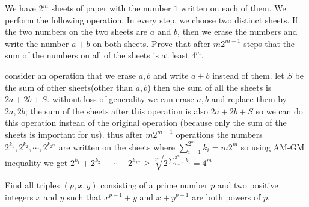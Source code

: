 \documentclass{subfile}
\begin{document}
	
	\begin{problem}
		We have $2^m$ sheets of paper with the number $1$ written on each of them. We perform the following operation. In every step, we choose two distinct sheets. If the two numbers on the two sheets are $a$ and $b$, then we erase the numbers and write the number $a+b$ on both sheets. Prove that after $m2^{m-1}$ steps that the sum of the numbers on all of the sheets is at least $4^m$.
	\end{problem}
	\begin{solution}
		 consider an operation that we erase $a,b$ and write $a+b$ instead of them. let $S$ be the sum of other sheets(other than $a,b$) then the sum of all the sheets is $2a+2b+S$. without loss of generality we can erase $a,b$ and replace them by $2a,2b$; the sum of the sheets after this operation is also $2a+2b+S$ so we can do this operation instead of the original operation (because only the sum of the sheets is important for us). thus after $m2^{m-1}$ operations the numbers $2^{k_1},2^{k_2},\cdots ,2^{k_{2^m}}$ are written on the sheets where $\sum_{i=1}^{2^m} k_i=m2^m$ so using AM-GM inequality we get $2^{k_1}+2^{k_2}+\cdots +2^{k_{2^m}}\ge \sqrt[2^m]{2^{\sum_{i=1}^{2^m} k_i}}=4^m$
	\end{solution}
	
	\begin{problem}
		Find all triples $(p, x, y)$ consisting of a prime number $p$ and two positive integers $x$ and $y$ such that
		$x^{p-1} + y$ and $x + y^{p-1}$ are both powers of $p$.
	\end{problem}
	
\end{document}
